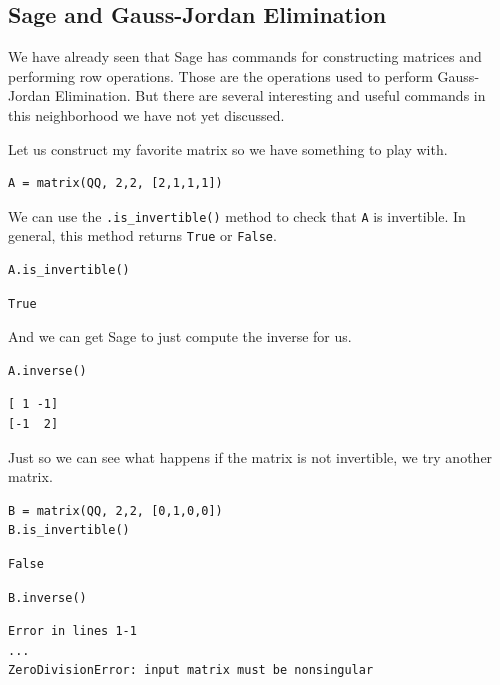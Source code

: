 \documentclass[10pt,]{book}
\theoremstyle{plain}
\numberwithin{equation}{section}
\begin{document}
\subsection[Sage and Gauss-Jordan Elimination]{Sage and Gauss-Jordan Elimination}\label{subsection-44}

      We have already seen that Sage has commands for constructing matrices and
      performing row operations. Those are the operations used to perform
      Gauss-Jordan Elimination. But there are several interesting and useful
      commands in this neighborhood we have not yet discussed.
\par

      Let us construct my favorite matrix so we have something to play with.
\begin{lstlisting}[style=sageinput]
A = matrix(QQ, 2,2, [2,1,1,1])
\end{lstlisting}
\par

      We can use the \verb?.is_invertible()? method to check that \verb?A? is
      invertible. In general, this method returns \verb?True? or \verb?False?.
\begin{lstlisting}[style=sageinput]
A.is_invertible()
\end{lstlisting}
\begin{lstlisting}[style=sageoutput]
True
\end{lstlisting}
\par

      And we can get Sage to just compute the inverse for us.
\begin{lstlisting}[style=sageinput]
A.inverse()
\end{lstlisting}
\begin{lstlisting}[style=sageoutput]
[ 1 -1]
[-1  2]
\end{lstlisting}
\par

      Just so we can see what happens if the matrix is not invertible, we try
      another matrix.
\begin{lstlisting}[style=sageinput]
B = matrix(QQ, 2,2, [0,1,0,0])
B.is_invertible()
\end{lstlisting}
\begin{lstlisting}[style=sageoutput]
False
\end{lstlisting}
\begin{lstlisting}[style=sageinput]
B.inverse()
\end{lstlisting}
\begin{lstlisting}[style=sageoutput]
Error in lines 1-1
...
ZeroDivisionError: input matrix must be nonsingular
\end{lstlisting}
\par
\end{document}
